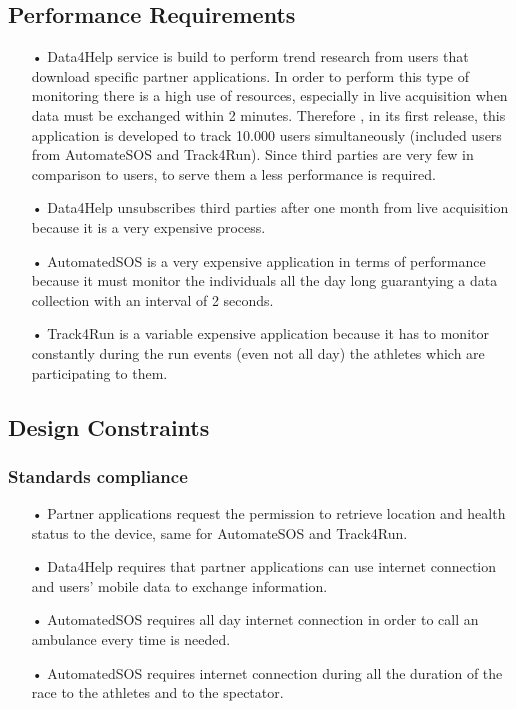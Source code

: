 \subsection{Performance Requirements}
\begin{enumerate} 
\item[•] Data4Help service is build to perform trend research from users that download specific partner applications. In order to perform this type of monitoring there is a high use of resources, especially in live acquisition when data must be exchanged within 2 minutes. Therefore , in its first release, this application is developed to track 10.000 users simultaneously (included users from AutomateSOS and Track4Run). 
Since third parties are very few in comparison to users, to serve them a less performance is required. 

\item[•] Data4Help unsubscribes third parties after one month from live acquisition because it is a very expensive process.

\item[•] AutomatedSOS is a very expensive application in terms of performance because it must monitor the individuals all the day long guarantying a data collection with an interval of 2 seconds.

\item[•] Track4Run is a variable expensive application because it has to monitor constantly during the run events (even not all day) the athletes which are participating to them.
\end{enumerate}

\subsection{Design Constraints}
\subsubsection{Standards compliance}
\begin{enumerate} 
\item[•] Partner applications request the permission to retrieve location and health status to the device, same for AutomateSOS and Track4Run.
\item[•] Data4Help requires that partner applications can use internet connection and users' mobile data to exchange information.
\item[•] AutomatedSOS requires all day internet connection in order to call an ambulance every time is needed.
\item[•] AutomatedSOS requires internet connection during all the duration of the race to the athletes and to the spectator.
\end{enumerate}

